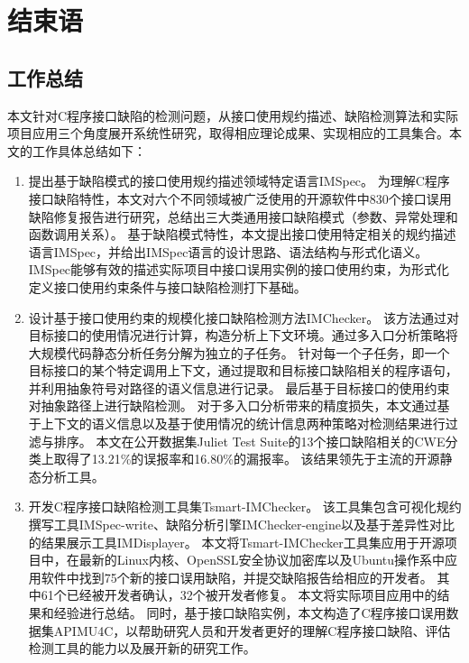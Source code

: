 \chapter{结束语}
\label{cha:con}

\section{工作总结}
本文针对C程序接口缺陷的检测问题，从接口使用规约描述、缺陷检测算法和实际项目应用三个角度展开系统性研究，取得相应理论成果、实现相应的工具集合。本文的工作具体总结如下：
\begin{enumerate}
	\item 提出基于缺陷模式的接口使用规约描述领域特定语言IMSpec。
	为理解C程序接口缺陷特性，本文对六个不同领域被广泛使用的开源软件中830个接口误用缺陷修复报告进行研究，总结出三大类通用接口缺陷模式（参数、异常处理和函数调用关系）。
	基于缺陷模式特性，本文提出接口使用特定相关的规约描述语言IMSpec，并给出IMSpec语言的设计思路、语法结构与形式化语义。
	IMSpec能够有效的描述实际项目中接口误用实例的接口使用约束，为形式化定义接口使用约束条件与接口缺陷检测打下基础。
	
	\item 设计基于接口使用约束的规模化接口缺陷检测方法IMChecker。
	该方法通过对目标接口的使用情况进行计算，构造分析上下文环境。通过多入口分析策略将大规模代码静态分析任务分解为独立的子任务。
	针对每一个子任务，即一个目标接口的某个特定调用上下文，通过提取和目标接口缺陷相关的程序语句，并利用抽象符号对路径的语义信息进行记录。
	最后基于目标接口的使用约束对抽象路径上进行缺陷检测。
	对于多入口分析带来的精度损失，本文通过基于上下文的语义信息以及基于使用情况的统计信息两种策略对检测结果进行过滤与排序。
	本文在公开数据集Juliet Test Suite的13个接口缺陷相关的CWE分类上取得了13.21\%的误报率和16.80\%的漏报率。
	该结果领先于主流的开源静态分析工具。
	
	\item 开发C程序接口缺陷检测工具集Tsmart-IMChecker。
	该工具集包含可视化规约撰写工具IMSpec-write、缺陷分析引擎IMChecker-engine以及基于差异性对比的结果展示工具IMDisplayer。
	本文将Tsmart-IMChecker工具集应用于开源项目中，在最新的Linux内核、OpenSSL安全协议加密库以及Ubuntu操作系中应用软件中找到75个新的接口误用缺陷，并提交缺陷报告给相应的开发者。
	其中61个已经被开发者确认，32个被开发者修复。
	本文将实际项目应用中的结果和经验进行总结。
	同时，基于接口缺陷实例，本文构造了C程序接口误用数据集APIMU4C，以帮助研究人员和开发者更好的理解C程序接口缺陷、评估检测工具的能力以及展开新的研究工作。
	
\end{enumerate}



